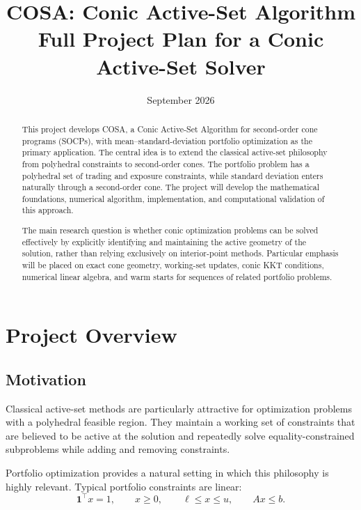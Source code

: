 \documentclass[11pt,a4paper]{article}
\title{\textbf{COSA: Conic Active-Set Algorithm}\\
\large Full Project Plan for a Conic Active-Set Solver}
\author{}
\date{September 2026}
\begin{document}
\maketitle

\begin{abstract}
This project develops COSA, a Conic Active-Set Algorithm for
second-order cone programs (SOCPs), with mean--standard-deviation
portfolio optimization as the primary application. The central idea
is to extend the classical active-set philosophy from polyhedral
constraints to second-order cones. The portfolio problem has a
polyhedral set of trading and exposure constraints, while standard
deviation enters naturally through a second-order cone. The project
will develop the mathematical foundations, numerical algorithm,
implementation, and computational validation of this approach.

The main research question is whether conic optimization problems can
be solved effectively by explicitly identifying and maintaining the
active geometry of the solution, rather than relying exclusively on
interior-point methods. Particular emphasis will be placed on exact
cone geometry, working-set updates, conic KKT conditions, numerical
linear algebra, and warm starts for sequences of related portfolio
problems.
\end{abstract}

\tableofcontents

\newpage

\section{Project Overview}

\subsection{Motivation}

Classical active-set methods are particularly attractive for
optimization problems with a polyhedral feasible region. They
maintain a working set of constraints that are believed to be active
at the solution and repeatedly solve equality-constrained subproblems
while adding and removing constraints.

Portfolio optimization provides a natural setting in which this
philosophy is highly relevant. Typical portfolio constraints are
linear:
\[
\mathbf{1}^{\top}x=1,
\qquad
x\geq 0,
\qquad
\ell\leq x\leq u,
\qquad
Ax\leq b.
\]
\end{document}
